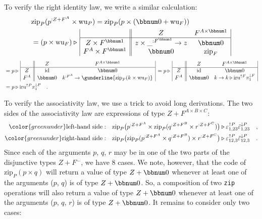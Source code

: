 To verify the right identity law, we write a similar calculation:
\begin{align*}
 & \text{zip}_{P}(p^{:Z+F^{A}}\times\text{wu}_{P})=\text{zip}_{P}(p\times(\bbnum 0+\text{wu}_{F}))\\
 & =(p\times\text{wu}_{F})\triangleright\,\begin{array}{|c||cc|}
 & Z & F^{A\times\bbnum 1}\\
\hline Z\times F^{\bbnum 1} & z\times\_^{:F^{\bbnum 1}}\rightarrow z & \bbnum 0\\
F^{A}\times F^{\bbnum 1} & \bbnum 0 & \text{zip}_{F}
\end{array}
\end{align*}
\begin{align*}
 & =p\triangleright\,\begin{array}{|c||cc|}
 & Z & F^{A\times\bbnum 1}\\
\hline Z & \text{id} & \bbnum 0\\
F^{A} & \bbnum 0 & k^{:F^{A}}\rightarrow\gunderline{\text{zip}_{F}(k\times\text{wu}_{F})}
\end{array}\,=p\triangleright\,\begin{array}{|c||cc|}
 & Z & F^{A\times\bbnum 1}\\
\hline Z & \text{id} & \bbnum 0\\
F^{A} & \bbnum 0 & k\rightarrow k\triangleright\text{iru}^{\uparrow F}\pi_{1}^{\downarrow F}
\end{array}\\
 & =p\triangleright\text{iru}^{\uparrow P}\pi_{1}^{\downarrow P}\quad.
\end{align*}

To verify the associativity law, we use a trick to avoid long derivations.
The two sides of the associativity law are expressions of type $Z+F^{A\times B\times C}$:
\begin{align*}
{\color{greenunder}\text{left-hand side}:}\quad & \text{zip}_{P}\big(p^{:Z+F^{A}}\times\text{zip}_{P}(q^{:Z+F^{B}}\times r^{:Z+F^{C}})\big)\triangleright\varepsilon_{1,23}^{\uparrow P}\tilde{\varepsilon}_{1,23}^{\downarrow P}\quad,\\
{\color{greenunder}\text{right-hand side}:}\quad & \text{zip}_{P}\big(\text{zip}_{P}(p^{:Z+F^{A}}\times q^{:Z+F^{B}})\times r^{:Z+F^{C}}\big)\triangleright\varepsilon_{12,3}^{\uparrow P}\tilde{\varepsilon}_{12,3}^{\downarrow P}\quad.
\end{align*}
Since each of the arguments $p$, $q$, $r$ may be in one of the
two parts of the disjunctive types $Z+F^{...}$, we have 8 cases.
We note, however, that the code of $\text{zip}_{P}(p\times q)$ will
return a value of type $Z+\bbnum 0$ whenever at least one of the
arguments ($p$, $q$) is of type $Z+\bbnum 0$. So, a composition
of two \lstinline!zip! operations will also return a value of type
$Z+\bbnum 0$ whenever at least one of the arguments ($p$, $q$,
$r$) is of type $Z+\bbnum 0$. It remains to consider only two cases: 

